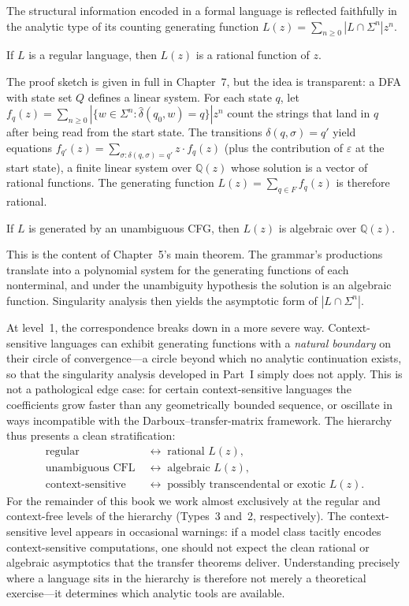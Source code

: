 The structural information encoded in a formal language is reflected faithfully in the analytic type of its counting generating function $L(z) = \sum_{n \ge 0} |L \cap \Sigma^n| z^n$.

\begin{theorem}
If $L$ is a regular language, then $L(z)$ is a rational function of $z$.
\end{theorem}

The proof sketch is given in full in Chapter~7, but the idea is transparent: a DFA with state set $Q$ defines a linear system. For each state $q$, let $f_q(z) = \sum_{n \ge 0} |\{w \in \Sigma^n : \hat{\delta}(q_0, w) = q\}| z^n$ count the strings that land in $q$ after being read from the start state. The transitions $\delta(q, \sigma) = q'$ yield equations $f_{q'}(z) = \sum_{\sigma : \delta(q,\sigma) = q'} z \cdot f_q(z)$ (plus the contribution of $\varepsilon$ at the start state), a finite linear system over $\mathbb{Q}(z)$ whose solution is a vector of rational functions. The generating function $L(z) = \sum_{q \in F} f_q(z)$ is therefore rational.

\begin{theorem}
If $L$ is generated by an unambiguous CFG, then $L(z)$ is algebraic over $\mathbb{Q}(z)$.
\end{theorem}

This is the content of Chapter~5's main theorem. The grammar's productions translate into a polynomial system for the generating functions of each nonterminal, and under the unambiguity hypothesis the solution is an algebraic function. Singularity analysis then yields the asymptotic form of $|L \cap \Sigma^n|$.

At level~1, the correspondence breaks down in a more severe way. Context-sensitive languages can exhibit generating functions with a \emph{natural boundary} on their circle of convergence—a circle beyond which no analytic continuation exists, so that the singularity analysis developed in Part~I simply does not apply. This is not a pathological edge case: for certain context-sensitive languages the coefficients grow faster than any geometrically bounded sequence, or oscillate in ways incompatible with the Darboux–transfer-matrix framework. The hierarchy thus presents a clean stratification:
\begin{align*}
\text{regular} &\;\longleftrightarrow\; \text{rational } L(z),\\
\text{unambiguous CFL} &\;\longleftrightarrow\; \text{algebraic } L(z),\\
\text{context-sensitive} &\;\longleftrightarrow\; \text{possibly transcendental or exotic } L(z).
\end{align*}
For the remainder of this book we work almost exclusively at the regular and context-free levels of the hierarchy (Types~3 and~2, respectively). The context-sensitive level appears in occasional warnings: if a model class tacitly encodes context-sensitive computations, one should not expect the clean rational or algebraic asymptotics that the transfer theorems deliver. Understanding precisely where a language sits in the hierarchy is therefore not merely a theoretical exercise—it determines which analytic tools are available.


